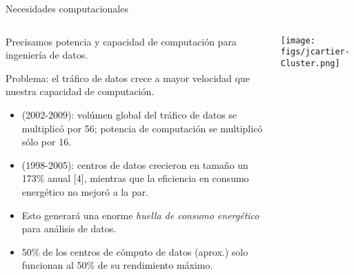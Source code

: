 \begin{frame}{Necesidades computacionales}
 \begin{columns}[T]
    \begin{column}{.7\textwidth}
    \begin{wideitemize}
     \item Precisamos potencia y capacidad de computación para ingeniería de
     datos.
     \item Problema: el tráfico de datos crece a mayor velocidad que nuestra
     capacidad de computación.
     \begin{itemize}
      \item (2002-2009): volúmen global del tráfico de datos se 
      multiplicó por 56; potencia de computación se multiplicó sólo por 16.
      \item (1998-2005): centros de datos crecieron en tamaño un 173\%
      anual [4], mientras que la eficiencia en consumo energético no mejoró a la par.
      \item Esto generará una enorme \textit{huella de consumo energético} para análisis
      de datos.
      \item 50\% de los centros de cómputo de datos (aprox.) solo funcionan
      al 50\% de su rendimiento máximo.
     \end{itemize}


    \end{wideitemize}

    \end{column}
    \begin{column}{.3\textwidth}
    \vspace*{1.7cm}
    \texttt{[image: figs/jcartier-Cluster.png]}
    \end{column}
  \end{columns}

\end{frame}


